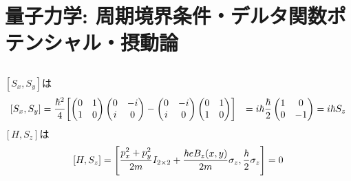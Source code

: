 \documentclass[../../sp_2015.tex]{subfiles}
\begin{document}
\section{量子力学: 周期境界条件・デルタ関数ポテンシャル・摂動論}
\subsection{}
\([S_x,S_y]\)は
\begin{equation}\begin{aligned}[b]
    [S_x,S_y]&=\frac{\hbar^2}{4}\qty[
        \begin{pmatrix}
            0 & 1\\ 1 & 0
        \end{pmatrix}
        \begin{pmatrix}
            0 & -i\\ i & 0
        \end{pmatrix}
        -\begin{pmatrix}
            0 & -i\\ i & 0
        \end{pmatrix}
        \begin{pmatrix}
            0 & 1\\ 1 & 0
        \end{pmatrix}]
    &= i\hbar\frac{\hbar}{2}
    \begin{pmatrix}
        1&0\\0&-1
    \end{pmatrix}=i\hbar S_z
\end{aligned}\end{equation}
\([H, S_z]\)は
\begin{equation}\begin{aligned}[b]
    [H,S_z]
    =\qty[\frac{p_x^2+p_y^2}{2m}I_{2\times2}+\frac{\hbar eB_z(x,y)}{2m}\sigma_z,\frac{\hbar}{2}\sigma_z]
    =0
\end{aligned}\end{equation}
\end{document}
